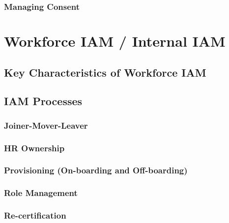 \hypertarget{managing-consent}{%
\subsection{\texorpdfstring{Managing Consent
}{Managing Consent }}\label{managing-consent}}

\hypertarget{workforce-iam-internal-iam}{%
\chapter{Workforce IAM / Internal
IAM}\label{workforce-iam-internal-iam}}

\hypertarget{key-characteristics-of-workforce-iam}{%
\section{Key Characteristics of Workforce
IAM}\label{key-characteristics-of-workforce-iam}}

\hypertarget{iam-processes}{%
\section{IAM Processes}\label{iam-processes}}

\hypertarget{joiner-mover-leaver}{%
\subsection{Joiner-Mover-Leaver}\label{joiner-mover-leaver}}

\hypertarget{hr-ownership}{%
\subsection{HR Ownership}\label{hr-ownership}}

\hypertarget{provisioning-on-boarding-and-off-boarding}{%
\subsection{Provisioning (On-boarding and
Off-boarding)}\label{provisioning-on-boarding-and-off-boarding}}

\hypertarget{role-management}{%
\subsection{Role Management}\label{role-management}}

\hypertarget{re-certification}{%
\subsection{Re-certification}\label{re-certification}}

